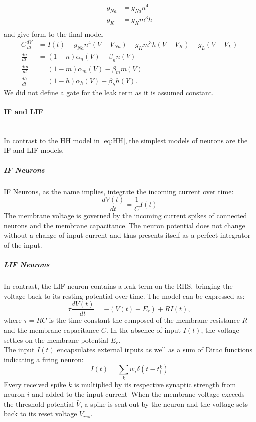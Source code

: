 \begin{equation}
\begin{aligned}
g_{Na} &= \bar{g}_{Na} n^4\\
g_{K} &= \bar{g}_{K} m^3h\\
\end{aligned}
\end{equation}
and give form to the final model
\begin{equation}\label{eq:HH}
\begin{aligned}
C\frac{dV}{dt} &= I(t) -\bar{g}_{Na} n^4(V-V_{Na}) - \bar{g}_{K} m^3h(V-V_{K}) -g_L(V-V_{L})\\
\frac{dn}{dt} &= (1-n)\alpha_n(V) - \beta_n n (V)\\
\frac{dm}{dt} &= (1-m)\alpha_m(V) - \beta_m m (V)\\
\frac{dh}{dt} &= (1-h)\alpha_h(V) - \beta_h h (V).
\end{aligned}
\end{equation}
We did not define a gate for the leak term as it is assumed constant.
\paragraph{IF and LIF}\mbox{}\\
In contrast to the \ac{HH} model in \cref{eq:HH}, the simplest models of neurons are the \ac{IF} and \ac{LIF} models.\\
\subparagraph{IF Neurons}
\ac{IF} Neurons, as the name implies, integrate the incoming current over time:
\begin{equation}
\frac{d V(t)}{d t} = \frac{1}{C}I(t)
\end{equation}
The membrane voltage is governed by the incoming current spikes of connected neurons and the membrane capacitance. The neuron potential does not change without a change of input current and thus presents itself as a perfect integrator of the input.
\subparagraph{\ac{LIF} Neurons}
In contrast, the \ac{LIF} neuron contains a leak term on the \ac{RHS}, bringing the voltage back to its resting potential over time. The model can be expressed as:
\begin{equation}
\tau\frac{dV(t)}{dt} = -(V(t)-E_r) + RI(t),
\end{equation}
where $\tau = RC$ is the time constant the composed of the membrane resistance $R$ and the membrane capacitance $C$. In the absence of input $I(t)$, the voltage settles on the membrane potential $E_r$.\\
The input $I(t)$ encapsulates external inputs as well as a sum of Dirac functions indicating a firing neuron:
\begin{equation}
I(t) = \sum_k w_i\delta(t-t^k_i)
\end{equation}
Every received spike $k$ is multiplied by its respective synaptic strength from neuron $i$ and added to the input current. When the membrane voltage exceeds the threshold potential $\bar{V}$, a spike is sent out by the neuron and the voltage sets back to its reset voltage $V_{res}$.
